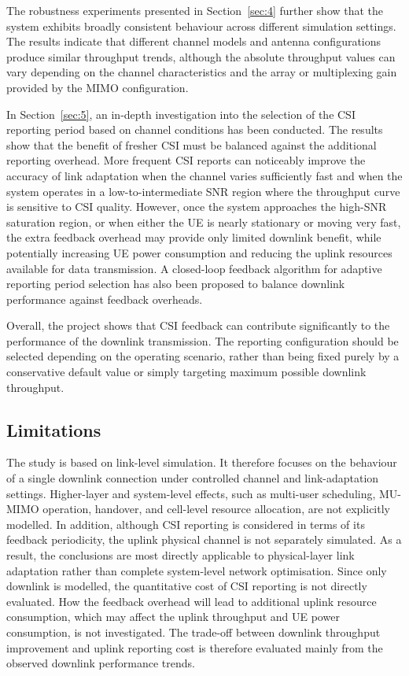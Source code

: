 \documentclass[a4paper,12pt,onecolumn]{article}
\begin{document}
		The robustness experiments presented in Section~\ref{sec:4} further show that the system exhibits broadly consistent behaviour across different simulation settings. The results indicate that different channel models and antenna configurations produce similar throughput trends, although the absolute throughput values can vary depending on the channel characteristics and the array or multiplexing gain provided by the MIMO configuration.
	
		In Section~\ref{sec:5}, an in-depth investigation into the selection of the CSI reporting period based on channel conditions has been conducted. The results show that the benefit of fresher CSI must be balanced against the additional reporting overhead. More frequent CSI reports can noticeably improve the accuracy of link adaptation when the channel varies sufficiently fast and when the system operates in a low-to-intermediate SNR region where the throughput curve is sensitive to CSI quality. However, once the system approaches the high-SNR saturation region, or when either the UE is nearly stationary or moving very fast, the extra feedback overhead may provide only limited downlink benefit, while potentially increasing UE power consumption and reducing the uplink resources available for data transmission. A closed-loop feedback algorithm for adaptive reporting period selection has also been proposed to balance downlink performance against feedback
		overheads.
		
		Overall, the project shows that CSI feedback can contribute significantly to the performance of the downlink transmission. The reporting configuration should be selected depending on the operating scenario, rather than being fixed purely by a conservative default value or simply targeting maximum possible downlink throughput.

	
	\subsection{Limitations}
		The study is based on link-level simulation. It therefore focuses on the behaviour of a single downlink connection under controlled channel and link-adaptation settings. Higher-layer and system-level effects, such as multi-user scheduling, MU-MIMO operation, handover, and cell-level resource allocation, are not explicitly modelled. In addition, although CSI reporting is considered in terms of its feedback periodicity, the uplink physical channel is not separately simulated. As a result, the conclusions are most directly applicable to physical-layer link adaptation rather than complete system-level network optimisation. Since only downlink is modelled, the quantitative cost of CSI reporting is not directly evaluated. How the feedback overhead will lead to additional uplink resource consumption, which may affect the uplink throughput and UE power consumption, is not investigated. The trade-off between downlink throughput improvement and uplink reporting cost is therefore evaluated mainly from the observed downlink performance trends.
		
\end{document}
